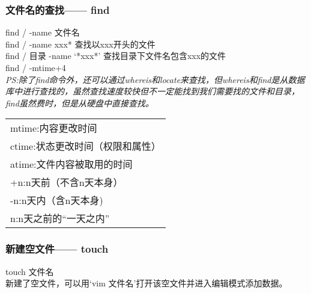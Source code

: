 \documentclass[12pt]{article}
\begin{document}
\begin{flushleft}
\begin{flushleft}
\begin{flushleft}
\begin{flushleft}
\subsubsection{文件名的查找——{} find}
\begin{flushleft}
find / -name 文件名\\
find / -name xxx*   查找以xxx开头的文件\\
find / 目录 -name `*xxx*' 查找目录下文件名包含xxx的文件\\
find / -mtime+4 \\

\emph{PS:除了find命令外，还可以通过whereis和locate来查找，但whereis和find是从数据库中进行查找的，虽然查找速度较快但不一定能找到我们需要找的文件和目录，find虽然费时，但是从硬盘中直接查找。}\\

\begin{tabular}{|p{15cm}|}
\hline
mtime:内容更改时间\\
ctime:状态更改时间（权限和属性）\\
atime:文件内容被取用的时间\\
+n:n天前（不含n天本身）\\
-n:n天内（含n天本身)\\
n:n天之前的``一天之内”\\
\hline
\end{tabular}
\end{flushleft}
\subsubsection{新建空文件——{} touch}
\begin{flushleft}
{\color{red}touch 文件名}\\
新建了空文件，可以用`vim 文件名'打开该空文件并进入编辑模式添加数据。
\end{flushleft}

\end{flushleft}
\end{flushleft}
\end{flushleft}
\end{flushleft}
\end{document}
